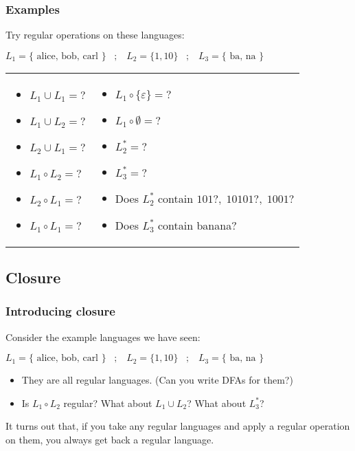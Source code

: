 \documentclass[xcolor=table]{beamer}
\begin{document}
\begin{frame}
  \frametitle{Examples}
  Try regular operations on these languages:
  
  \begin{example}
    $L_1 = \{ \mbox{ alice, bob, carl } \} \;\;\;; \;\;\; L_2 = \{ 1,10 \} \;\;\;;\;\;\; L_3 = \{ \mbox{ ba, na } \}$
  \end{example}
  
  \medskip
  \begin{tabular}[t]{ll}
    \begin{minipage}{1in}
      \begin{itemize}
      \item $L_1 \cup L_1 = ?$ 
      \item $L_1 \cup L_2 = ?$ 
      \item $L_2 \cup L_1 = ?$ 
      \item $L_1 \circ L_2 = ?$ 
      \item $L_2 \circ L_1 = ?$ 
      \item $L_1 \circ L_1 = ?$ 
      \end{itemize}
    \end{minipage} &
    \begin{minipage}{3in}
      \begin{itemize}
      \item $L_1 \circ \{\varepsilon\} = ?$
      \item $L_1 \circ \emptyset = ?$
      \item $L_2^* = ?$ 
      \item $L_3^* = ?$ 
      \item Does $L_2^*$ contain $101?, \;10101?,\; 1001?$
      \item Does $L_3^*$ contain banana?
      \end{itemize}
    \end{minipage}
  \end{tabular}
\end{frame}

\subsection[closure]{Closure}

\begin{frame}
  \frametitle{Introducing closure}

  Consider the example languages we have seen:
  \begin{example}
    $L_1 = \{ \mbox{ alice, bob, carl } \} \;\;\;; \;\;\; L_2 = \{ 1,10 \} \;\;\;;\;\;\; L_3 = \{ \mbox{ ba, na } \}$
  \end{example}

  \begin{itemize}
    \item They are all regular languages. (Can you write DFAs for them?)
    \item Is $L_1 \circ L_2$ regular? What about $L_1 \cup L_2$? What about $L_3^*$?
  \end{itemize}
  \bigskip

  It turns out that, if you take any regular languages and apply a
  regular operation on them, you always get back a regular language.
\end{frame}
\end{document}
